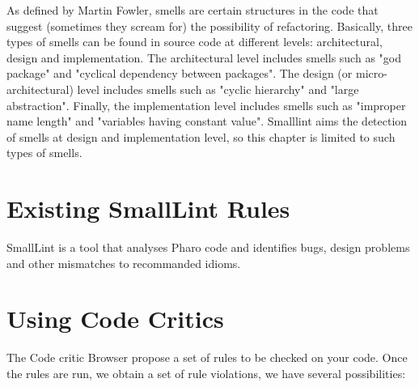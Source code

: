 \documentclass[a4paper,10pt,twoside]{book}
\begin{document}
As defined by Martin Fowler, smells are certain structures in the code that suggest (sometimes they scream for) the possibility of refactoring.
Basically, three types of smells can be found in source code at different levels: architectural, design and implementation. The architectural level includes smells such as "god package" and "cyclical dependency between packages". The design (or micro-architectural) level includes smells such as "cyclic hierarchy" and "large abstraction". Finally, the implementation level includes smells such as "improper name length" and "variables having constant value". Smalllint aims the detection of smells at design and implementation level, so this chapter is limited  to such types of smells.



\section{Existing SmallLint Rules}\label{existingRules}
SmallLint is a tool that analyses Pharo code and identifies bugs, design problems and other mismatches to recommanded idioms. 





\section{Using Code Critics}
The Code critic Browser propose a set of rules to be checked on your code. 
Once the rules are run, we obtain a set of rule violations, we have several possibilities:
\end{document}
